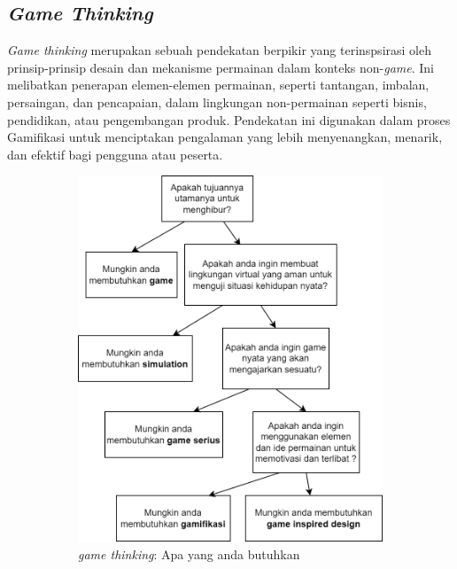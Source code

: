 \subsection{\textit{Game Thinking}}
\textit{Game thinking} merupakan sebuah pendekatan berpikir yang terinspsirasi oleh prinsip-prinsip desain dan mekanisme permainan dalam konteks non-\textit{game}. 
Ini melibatkan penerapan elemen-elemen permainan, seperti tantangan, imbalan, persaingan, dan pencapaian, dalam lingkungan non-permainan seperti bisnis, pendidikan, atau pengembangan produk\cite{schell2008art}.
Pendekatan ini digunakan dalam proses Gamifikasi untuk menciptakan pengalaman yang lebih menyenangkan, menarik, dan efektif bagi pengguna atau peserta.
\begin{figure}[H]
	\centering
	\begin{subfigure}[b]{0.4\textwidth}
		\centering
	  \includegraphics[width=\linewidth]{contents/chapter-2/images/Game-thinking-2.png}
	  \caption{\textit{game thinking}: Apa yang anda butuhkan}
	  \label{fig:sub-gamethink-1}
	\end{subfigure}
	\hfill
	\begin{subfigure}[b]{0.4\textwidth}

\end{subfigure}
\end{figure}
